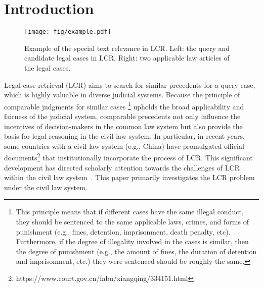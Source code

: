 \section{Introduction} \label{sec: introduction}
\begin{figure}[t]
\centering
\texttt{[image: fig/example.pdf]}
\caption{Example of the special text relevance in LCR. Left: the query and candidate legal cases in LCR. Right: two applicable law articles of the legal cases.}
\label{fig: LCR_example}
\end{figure}
Legal case retrieval (LCR) aims to search for similar precedents for a query case, which is highly valuable in diverse judicial systems.
Because the principle of comparable judgments for similar cases
\footnote{This principle means that if different cases have the same illegal conduct, they should be sentenced to the same applicable laws, crimes, and forms of punishment (e.g., fines, detention, imprisonment, death penalty, etc). Furthermore, if the degree of illegality involved in the cases is similar, then the degree of punishment (e.g., the amount of fines, the duration of detention and imprisonment, etc.) they were sentenced should be roughly the same.} 
upholds the broad applicability and fairness of the judicial system, comparable precedents not only influence the incentives of decision-makers in the common law system but also provide the basis for legal reasoning in the civil law system.
In particular, in recent years, some countries with a civil law system (e.g., China) have promulgated official documents\footnote{https://www.court.gov.cn/fabu/xiangqing/334151.html} that institutionally incorporate the process of LCR.
This significant development has directed scholarly attention towards the challenges of LCR within the civil law system~\cite{ma2021LeCaRD, yu2022Explainable, sun2023law}.
This paper primarily investigates the LCR problem under the civil law system.


